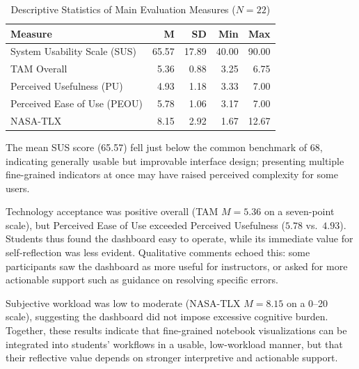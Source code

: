 \documentclass[sigconf]{acmart}
\begin{document}
\begin{table}
  \centering
  \caption{Descriptive Statistics of Main Evaluation Measures ($N=22$)}
  \label{tab:descriptive_stats}
  \small
  \begin{tabular}{l r r r r}
    \toprule
    \textbf{Measure} & \textbf{M} & \textbf{SD} & \textbf{Min} & \textbf{Max} \\
    \midrule
    System Usability Scale (SUS)      & 65.57 & 17.89 & 40.00 & 90.00 \\
    TAM Overall                       &  5.36 &  0.88 &  3.25 &  6.75 \\
    \quad Perceived Usefulness (PU)   &  4.93 &  1.18 &  3.33 &  7.00 \\
    \quad Perceived Ease of Use (PEOU)&  5.78 &  1.06 &  3.17 &  7.00 \\
    NASA-TLX                          &  8.15 &  2.92 &  1.67 & 12.67 \\
    \bottomrule
  \end{tabular}
\end{table}

The mean SUS score (65.57) fell just below the common benchmark of 68, indicating generally usable but improvable interface design; presenting multiple fine-grained indicators at once may have raised perceived complexity for some users.

Technology acceptance was positive overall (TAM $M=5.36$ on a seven-point scale), but Perceived Ease of Use exceeded Perceived Usefulness ($5.78$ vs.\ $4.93$). Students thus found the dashboard easy to operate, while its immediate value for self-reflection was less evident. Qualitative comments echoed this: some participants saw the dashboard as more useful for instructors, or asked for more actionable support such as guidance on resolving specific errors.

Subjective workload was low to moderate (NASA-TLX $M=8.15$ on a 0--20 scale), suggesting the dashboard did not impose excessive cognitive burden. Together, these results indicate that fine-grained notebook visualizations can be integrated into students' workflows in a usable, low-workload manner, but that their reflective value depends on stronger interpretive and actionable support.
\end{document}
